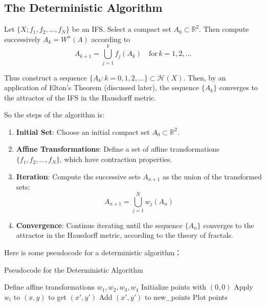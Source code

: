 \documentclass[a4paper,11pt, titlepage]{article}
\theoremstyle{definition}
\theoremstyle{plain}
\theoremstyle{remark}
\theoremstyle{definition}
\begin{document}
\subsection{The Deterministic Algorithm \cite{barnsley2014fractals}}

Let $\{X; f_1, f_2, \ldots, f_N\}$ be an IFS. Select a compact set $A_0 \subset \mathbb{R}^2$. Then compute successively $A_k = W^{n}(A)$ according to
\[
A_{k+1} = \bigcup_{j=1}^k f_j(A_k) \quad \text{for} \, k = 1, 2, \ldots
\]

Thus construct a sequence $\{A_k : k = 0, 1, 2, \ldots\} \subset \mathcal{H}(X)$. Then, by an application of Elton's Theorem (discussed later), the sequence $\{A_k\}$ converges to the attractor of the IFS in the Hausdorff metric.

So the steps of the algorithm is:

\begin{enumerate}
    \item \textbf{Initial Set}: Choose an initial compact set \( A_0 \subset \mathbb{R}^2 \).
    \item \textbf{Affine Transformations}: Define a set of affine transformations \( \{f_1, f_2, \ldots, f_N\} \), which have contraction properties.
    \item \textbf{Iteration}: Compute the successive sets \( A_{n+1} \) as the union of the transformed sets:
    \[
    A_{n+1} = \bigcup_{j=1}^N w_j(A_n)
    \]
    \item \textbf{Convergence}: Continue iterating until the sequence \( \{A_n\} \) converges to the attractor in the Hausdorff metric, according to the theory of fractals.
\end{enumerate}

Here is some pseudocode for a deterministic algorithm：

\begin{algorithm}
\caption{Pseudocode for the Deterministic Algorithm}
\begin{algorithmic}[1]
    \STATE Define affine transformations \(w_1, w_2, w_3, w_4\)\;
    \STATE Initialize points with \((0, 0)\)\;
        \STATE Apply \(w_i\) to \((x, y)\) to get \((x', y')\)\;
            Add \((x', y')\) to new\_points\;
        \ENDFOR
    \ENDFOR
    \STATE Plot points\;
\end{algorithmic}
\end{algorithm}
\end{document}
